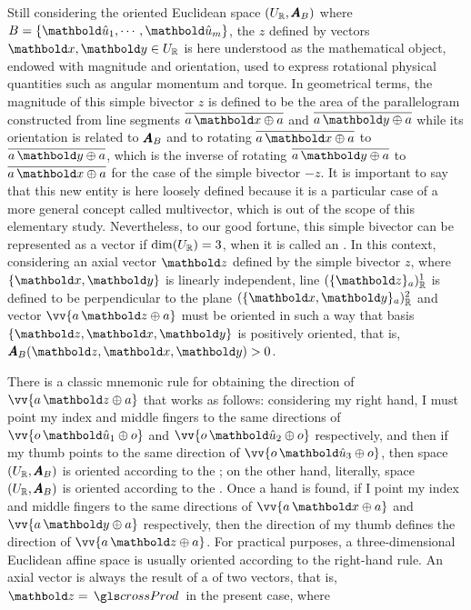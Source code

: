 Still considering  the oriented Euclidean space $(U_{\mathbb{R}},\pmb{A}_B)$ where $B=\{\vun{u}_1,\cdots,\vun{u}_m\}$, the  $z$ defined by vectors $\vto{x},\vto{y}\in U_\real$ is here understood as the mathematical object, endowed with magnitude and orientation, used to express rotational physical quantities such as angular momentum and torque. In geometrical terms, the magnitude of this simple bivector $z$ is defined to be the area of the parallelogram constructed from line segments $\overline{a\,\vto{x}\oplus a}$ and $\overline{a\,\vto{y}\oplus a}$ while its orientation is related to $\pmb{A}_B$ and to rotating $\overline{a\,\vto{x}\oplus a}$ to $\overline{a\,\vto{y}\oplus a}$, which is the inverse of rotating $\overline{a\,\vto{y}\oplus a}$ to $\overline{a\,\vto{x}\oplus a}$ for the case of the simple bivector $-z$. It is important to say that this new entity is here loosely defined because it is a particular case of a more general concept called multivector, which is out of the scope of this elementary study. Nevertheless, to our good fortune, this simple bivector can be represented as a vector if $\dim(U_{\mathbb{R}})=3$, when it is called an . In this context, considering an axial vector $\vto{z}$ defined by the simple bivector $z$, where $\{\vto{x},\vto{y}\}$ is linearly independent, line $(\{\vto{z}\}_a)_\real^1$ is defined to be perpendicular to the plane $(\{\vto{x},\vto{y}\}_a)_\real^2$ and vector $\vv{a\,\vto{z}\oplus a}$ must be oriented in such a way that basis $\{\vto{z},\vto{x},\vto{y}\}$ is positively oriented, that is, $\fua{\tnr{A}_B}{\vto{z},\vto{x},\vto{y}}>0$.
\begin{figure}[!ht]
\centering
\begin{center}
\scalebox{.72}{}
\end{center}
\label{fg:axial}
\end{figure}
There is a classic mnemonic rule for obtaining the direction of $\vv{a\,\vto{z}\oplus a}$ that works as follows: considering my right hand, I must point my index and middle fingers to the same directions of $\vv{o\,\vun{u}_1\oplus o}$ and $\vv{o\,\vun{u}_2\oplus o}$ respectively, and then if my thumb points to the same direction of $\vv{o\,\vun{u}_3\oplus o}$, then space $(U_{\mathbb{R}},\pmb{A}_B)$ is oriented according to the ; on the other hand, literally, space $(U_{\mathbb{R}},\pmb{A}_B)$ is oriented according to the . Once a hand is found, if I point my index and middle fingers to the same directions of $\vv{a\,\vto{x}\oplus a}$ and $\vv{a\,\vto{y}\oplus a}$ respectively, then the direction of my thumb defines the direction of $\vv{a\,\vto{z}\oplus a}$. For practical purposes, a three-dimensional Euclidean affine space is usually oriented according to the right-hand rule. An axial vector is always the result of a  of two vectors, that is, $\vto{z}=\gloref{crossProd}$ in the present case, where

